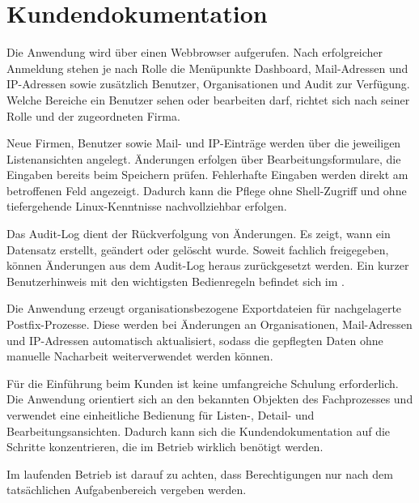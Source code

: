 \section{Kundendokumentation}
\label{sec:Kundendokumentation}
Die Anwendung wird über einen Webbrowser aufgerufen. Nach erfolgreicher
Anmeldung stehen je nach Rolle die Menüpunkte Dashboard, Mail-Adressen und
IP-Adressen sowie zusätzlich Benutzer, Organisationen und Audit zur Verfügung.
Welche Bereiche ein Benutzer sehen oder bearbeiten darf, richtet sich nach
seiner Rolle und der zugeordneten Firma.

Neue Firmen, Benutzer sowie Mail- und IP-Einträge werden über die
jeweiligen Listenansichten angelegt. Änderungen erfolgen über
Bearbeitungsformulare, die Eingaben bereits beim Speichern prüfen. Fehlerhafte
Eingaben werden direkt am betroffenen Feld angezeigt. Dadurch kann die Pflege
ohne Shell-Zugriff und ohne tiefergehende Linux-Kenntnisse nachvollziehbar
erfolgen.

Das Audit-Log dient der Rückverfolgung von Änderungen. Es zeigt, wann
ein Datensatz erstellt, geändert oder gelöscht wurde. Soweit fachlich
freigegeben, können Änderungen aus dem Audit-Log heraus zurückgesetzt
werden. Ein kurzer Benutzerhinweis mit den wichtigsten Bedienregeln befindet
sich im .

Die Anwendung erzeugt organisationsbezogene Exportdateien für
nachgelagerte Postfix-Prozesse. Diese werden bei Änderungen an
Organisationen, Mail-Adressen und IP-Adressen automatisch aktualisiert, sodass
die gepflegten Daten ohne manuelle Nacharbeit weiterverwendet werden können.

Für die Einführung beim Kunden ist keine umfangreiche Schulung erforderlich.
Die Anwendung orientiert sich an den bekannten Objekten des Fachprozesses und
verwendet eine einheitliche Bedienung für Listen-, Detail- und
Bearbeitungsansichten. Dadurch kann sich die Kundendokumentation auf die
Schritte konzentrieren, die im Betrieb wirklich benötigt werden.

Im laufenden Betrieb ist darauf zu achten, dass Berechtigungen nur nach dem
tatsächlichen Aufgabenbereich vergeben werden.
